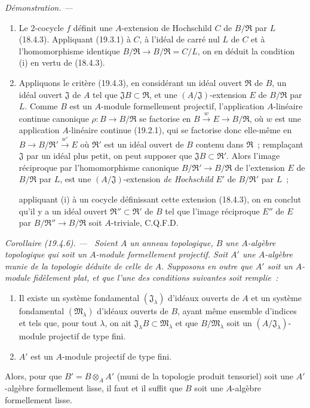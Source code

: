 \documentclass[10pt,oneside]{book}
\makeatletter
\newcommand{\setmanualcurrentlabel}[1]{\def\@currentlabel{#1}}
\newcommand{\oldpage}[2][]{%
  \setcounter{footnote}{0}%
  \marginpar{\scriptsize\textbf{#1}~|~#2}\ignorespaces}
\newenvironment{corollary}[1][]{%
  \setmanualcurrentlabel{#1}\par\medskip\noindent\itshape Corollaire (#1). ---\ }{\par}
\newenvironment{proof}{%
  \par\medskip\noindent\textit{Démonstration. ---\ }}{\par}
\makeatother
\begin{document}
\begin{proof}
\begin{enumerate}
  \item[(i)] Le $2$-cocycle $f$ définit une $A$-extension de Hochschild $C$
  de $B/\mathfrak R$ par $L$ (18.4.3). Appliquant (19.3.1) à $C$, à l'idéal
  de carré nul $L$ de $C$ et à l'homomorphisme identique
  $B/\mathfrak R\to B/\mathfrak R=C/L$, on en déduit la condition (i) en
  vertu de (18.4.3).
  \item[(ii)] Appliquons le critère (19.4.3), en considérant un idéal ouvert
  $\mathfrak R$ de $B$, un idéal ouvert $\mathfrak J$ de $A$ tel que
  $\mathfrak JB\subset\mathfrak R$, et une $(A/\mathfrak J)$-extension $E$
  de $B/\mathfrak R$ par $L$. Comme $B$ est un $A$-module formellement
  projectif, l'application $A$-linéaire continue canonique
  $\rho:B\to B/\mathfrak R$ se factorise en
  $B\xrightarrow{w}E\to B/\mathfrak R$, où $w$ est une application
  $A$-linéaire continue (19.2.1), qui se factorise donc elle-même en
  $B\to B/\mathfrak R'\xrightarrow{w'}E$ où $\mathfrak R'$ est un idéal
  ouvert de $B$ contenu dans $\mathfrak R$~; remplaçant $\mathfrak J$ par
  un idéal plus petit, on peut supposer que
  $\mathfrak JB\subset\mathfrak R'$. Alors l'image réciproque par
  l'homomorphisme canonique $B/\mathfrak R'\to B/\mathfrak R$ de
  l'extension $E$ de $B/\mathfrak R$ par $L$, est une
  $(A/\mathfrak J)$-extension \emph{de Hochschild} $E'$ de
  $B/\mathfrak R'$ par $L$~;

  \oldpage[0\textsubscript{IV-1}]{88}

  appliquant (i) à un cocycle définissant cette extension (18.4.3), on en
  conclut qu'il y a un idéal ouvert
  $\mathfrak R''\subset\mathfrak R'$ de $B$ tel que l'image réciproque
  $E''$ de $E$ par $B/\mathfrak R''\to B/\mathfrak R$ soit
  $A$-triviale, C.Q.F.D.
\end{enumerate}
\end{proof}

\begin{corollary}[19.4.6]
\label{0.19.4.6-fr}
Soient $A$ un anneau topologique, $B$ une $A$-algèbre topologique qui soit un
$A$-module formellement projectif. Soit $A'$ une $A$-algèbre \emph{munie de
la topologie déduite de celle de $A$}. Supposons en outre que $A'$ soit un
$A$-module fidèlement plat, et que l'une des conditions suivantes soit
remplie~:
\begin{enumerate}
  \item[$1^\circ$] Il existe un système fondamental
  $(\mathfrak J_\lambda)$ d'idéaux ouverts de $A$ et un système fondamental
  $(\mathfrak M_\lambda)$ d'idéaux ouverts de $B$, ayant même ensemble
  d'indices et tels que, pour tout $\lambda$, on ait
  $\mathfrak J_\lambda B\subset\mathfrak M_\lambda$ et que
  $B/\mathfrak M_\lambda$ soit un
  $(A/\mathfrak J_\lambda)$-module projectif de type fini.
  \item[$2^\circ$] $A'$ est un $A$-module projectif de type fini.
\end{enumerate}
Alors, pour que $B'=B\otimes_A A'$ (muni de la topologie produit tensoriel)
soit une $A'$-algèbre formellement lisse, il faut et il suffit que $B$ soit une
$A$-algèbre formellement lisse.
\end{corollary}
\end{document}

